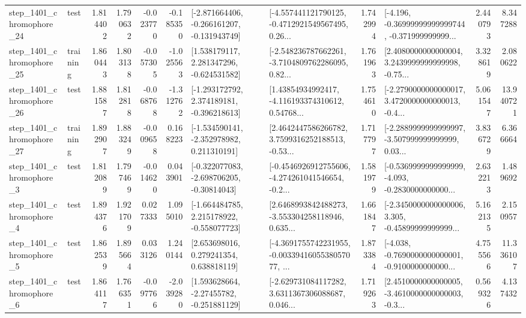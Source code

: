\begin{tabular}{llrrrrllrlrr}
 step\_1401\_chromophore\_24 &      test &      1.814402 &    1.790632 &     -0.023770 & -0.185350 &  [-2.871664406, -0.266161207, -0.131943749] &  [-4.557441121790125, -0.4712921549567495, 0.26... &       1.742994 &  [-4.196, -0.36999999999999744, -0.371999999999... &            2.440793 &          8.347288 \\
 step\_1401\_chromophore\_25 &  training &      1.860443 &    1.803138 &     -0.057305 & -1.025563 &    [1.538179117, 2.281347296, -0.624531582] &  [-2.548236787662261, -3.7104809762286095, 0.82... &       1.761963 &  [2.4080000000000004, 3.2439999999999998, -0.75... &            3.328619 &          2.080622 \\
 step\_1401\_chromophore\_26 &      test &      1.881587 &    1.812818 &     -0.068768 & -1.312762 &   [-1.293172792, 2.374189181, -0.396218613] &  [1.43854934992417, -4.116193374310612, 0.54768... &       1.754610 &  [-2.2790000000000017, 3.4720000000000013, -0.4... &            5.061547 &         13.940721 \\
 step\_1401\_chromophore\_27 &  training &      1.892907 &    1.883249 &     -0.009658 &  0.168223 &   [-1.534590141, -2.352978982, 0.211310191] &  [2.4642447586266782, 3.7599316252188513, -0.53... &       1.717797 &  [-2.2889999999999997, -3.507999999999999, 0.03... &            3.836729 &          6.366664 \\
  step\_1401\_chromophore\_3 &      test &      1.812089 &    1.797469 &     -0.014620 &  0.043901 &   [-0.322077083, -2.698706205, -0.30814043] &  [-0.4546926912755606, -4.274261041546654, -0.2... &       1.581979 &  [-0.5369999999999999, -4.093, -0.2830000000000... &            2.632213 &          1.489692 \\
  step\_1401\_chromophore\_4 &      test &      1.894376 &    1.921709 &      0.027333 &  1.095010 &   [-1.664484785, 2.215178922, -0.558077723] &  [2.6468993842488273, -3.553304258118946, 0.635... &       1.661847 &  [-2.3450000000000006, 3.305, -0.45899999999999... &            5.162135 &          2.150957 \\
  step\_1401\_chromophore\_5 &      test &      1.862539 &    1.895664 &      0.033126 &  1.240144 &     [2.653698016, 0.279241354, 0.638818119] &  [-4.3691755742231955, -0.0033941605538057077, ... &       1.873384 &  [-4.038, -0.7690000000000001, -0.9100000000000... &            4.755566 &         11.336107 \\
  step\_1401\_chromophore\_6 &      test &      1.864117 &    1.766351 &     -0.097766 & -2.039280 &    [1.593628664, -2.27455782, -0.251881129] &  [-2.629731084117282, 3.6311367306088687, 0.046... &       1.719263 &  [2.4510000000000005, -3.4610000000000003, -0.3... &            0.569326 &          4.137432 \\

\end{tabular}
